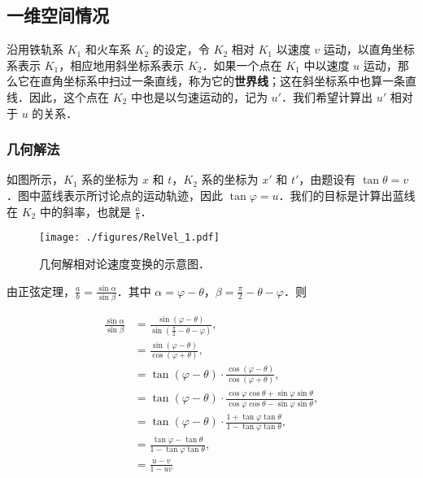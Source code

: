 
\subsection{一维空间情况}

沿用铁轨系 $K_1$ 和火车系 $K_2$ 的设定，令 $K_2$ 相对 $K_1$ 以速度 $v$ 运动，以直角坐标系表示 $K_1$，相应地用斜坐标系表示 $K_2$．如果一个点在 $K_1$ 中以速度 $u$ 运动，那么它在直角坐标系中扫过一条直线，称为它的\textbf{世界线}；这在斜坐标系中也算一条直线．因此，这个点在 $K_2$ 中也是以匀速运动的，记为 $u'$．我们希望计算出 $u'$ 相对于 $u$ 的关系．


\subsubsection{几何解法}

如图所示，$K_1$ 系的坐标为 $x$ 和 $t$，$K_2$ 系的坐标为 $x'$ 和 $t'$，由题设有 $\tan{\theta}=v$．图中蓝线表示所讨论点的运动轨迹，因此 $\tan{\varphi}=u$．我们的目标是计算出蓝线在 $K_2$ 中的斜率，也就是 $\frac{a}{b}$．


\begin{figure}[ht]
\centering
\texttt{[image: ./figures/RelVel\_1.pdf]}
\caption{几何解相对论速度变换的示意图．} \label{RelVel_fig1}
\end{figure}

由正弦定理，$\frac{a}{b}=\frac{\sin{\alpha}}{\sin{\beta}}$．其中 $\alpha=\varphi-\theta$，$\beta=\frac{\pi}{2}-\theta-\varphi$．则

\begin{equation}\label{RelVel_eq1}
\begin{aligned}
\frac{\sin{\alpha}}{\sin{\beta}}&=\frac{\sin{(\varphi-\theta)}}{\sin{(\frac{\pi}{2}-\theta-\varphi)}},\\ 
&=\frac{\sin{(\varphi-\theta)}}{\cos{(\varphi+\theta)}},\\ 
&=\tan(\varphi-\theta)\cdot\frac{\cos(\varphi-\theta)}{\cos(\varphi+\theta)},\\ 
&=\tan(\varphi-\theta)\cdot\frac{\cos\varphi\cos\theta+\sin\varphi\sin\theta}{\cos\varphi\cos\theta-\sin\varphi\sin\theta},\\ 
&=\tan(\varphi-\theta)\cdot\frac{1+\tan\varphi\tan\theta}{1-\tan\varphi\tan\theta},\\ 
&=\frac{\tan\varphi-\tan\theta}{1-\tan\varphi\tan\theta},\\ 
&=\frac{u-v}{1-uv}
\end{aligned}
\end{equation}

